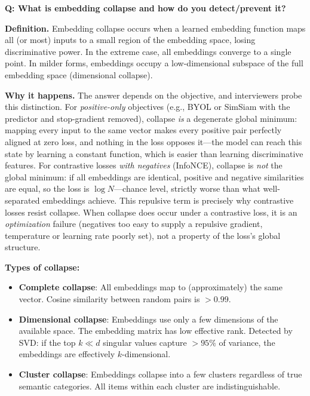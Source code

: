 \begin{interviewq}
\textbf{Q: What is embedding collapse and how do you detect/prevent it?}

 \quad {} \quad \badgefreq{\freqmed}

\stronganswer

\textbf{Definition.} Embedding collapse occurs when a learned embedding function maps all (or most) inputs to a small region of the embedding space, losing discriminative power. In the extreme case, all embeddings converge to a single point. In milder forms, embeddings occupy a low-dimensional subspace of the full embedding space (dimensional collapse).

\textbf{Why it happens.} The answer depends on the objective, and interviewers probe this distinction. For \textit{positive-only} objectives (e.g., BYOL or SimSiam with the predictor and stop-gradient removed), collapse \textit{is} a degenerate global minimum: mapping every input to the same vector makes every positive pair perfectly aligned at zero loss, and nothing in the loss opposes it---the model can reach this state by learning a constant function, which is easier than learning discriminative features. For contrastive losses \textit{with negatives} (InfoNCE), collapse is \textit{not} the global minimum: if all embeddings are identical, positive and negative similarities are equal, so the loss is $\log N$---chance level, strictly worse than what well-separated embeddings achieve. This repulsive term is precisely why contrastive losses resist collapse. When collapse does occur under a contrastive loss, it is an \textit{optimization} failure (negatives too easy to supply a repulsive gradient, temperature or learning rate poorly set), not a property of the loss's global structure.

\textbf{Types of collapse:}
\begin{itemize}
    \item \textbf{Complete collapse}: All embeddings map to (approximately) the same vector. Cosine similarity between random pairs is $>0.99$.
    \item \textbf{Dimensional collapse}: Embeddings use only a few dimensions of the available space. The embedding matrix has low effective rank. Detected by SVD: if the top $k \ll d$ singular values capture $>95\%$ of variance, the embeddings are effectively $k$-dimensional.
    \item \textbf{Cluster collapse}: Embeddings collapse into a few clusters regardless of true semantic categories. All items within each cluster are indistinguishable.
\end{itemize}


\end{interviewq}
